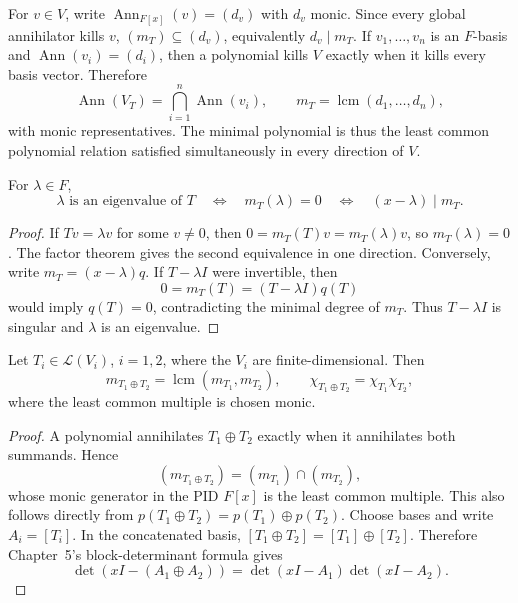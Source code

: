 For \(v\in V\), write \(\operatorname{Ann}_{F[x]}(v)=(d_v)\) with \(d_v\)
monic. Since every global annihilator kills \(v\),
\((m_T)\subseteq(d_v)\), equivalently \(d_v\mid m_T\). If
\(v_1,\ldots,v_n\) is an \(F\)-basis and
\(\operatorname{Ann}(v_i)=(d_i)\), then a polynomial kills \(V\) exactly
when it kills every basis vector. Therefore
\[
\operatorname{Ann}(V_T)=\bigcap_{i=1}^n\operatorname{Ann}(v_i),
\qquad
m_T=\operatorname{lcm}(d_1,\ldots,d_n),
\]
with monic representatives. The minimal polynomial is thus the least common
polynomial relation satisfied simultaneously in every direction of \(V\).

\begin{proposition}
\label{prop:eigenvalue-minimal-polynomial}
For \(\lambda\in F\),
\[
\lambda\text{ is an eigenvalue of }T
\quad\Longleftrightarrow\quad m_T(\lambda)=0
\quad\Longleftrightarrow\quad (x-\lambda)\mid m_T.
\]
\end{proposition}
\begin{proof}
If \(Tv=\lambda v\) for some \(v\ne0\), then
\(0=m_T(T)v=m_T(\lambda)v\), so \(m_T(\lambda)=0\). The factor theorem gives
the second equivalence in one direction. Conversely, write
\(m_T=(x-\lambda)q\). If \(T-\lambda I\) were invertible, then
\[
0=m_T(T)=(T-\lambda I)q(T)
\]
would imply \(q(T)=0\), contradicting the minimal degree of \(m_T\). Thus
\(T-\lambda I\) is singular and \(\lambda\) is an eigenvalue.
\end{proof}

\begin{proposition}
\label{prop:direct-sum-polynomials}
Let \(T_i\in\mathcal L(V_i)\), \(i=1,2\), where the \(V_i\) are
finite-dimensional. Then
\[
m_{T_1\oplus T_2}
=\operatorname{lcm}(m_{T_1},m_{T_2}),
\qquad
\chi_{T_1\oplus T_2}=\chi_{T_1}\chi_{T_2},
\]
where the least common multiple is chosen monic.
\end{proposition}
\begin{proof}
A polynomial annihilates \(T_1\oplus T_2\) exactly when it annihilates both
summands.  Hence
\[
(m_{T_1\oplus T_2})
=(m_{T_1})\cap(m_{T_2}),
\]
whose monic generator in the PID \(F[x]\) is the least common multiple.
This also follows directly from
\(p(T_1\oplus T_2)=p(T_1)\oplus p(T_2)\). Choose bases and write
\(A_i=[T_i]\). In the concatenated basis,
\([T_1\oplus T_2]=[T_1]\oplus[T_2]\). Therefore
Chapter~5's block-determinant formula gives
\[
\det(xI-(A_1\oplus A_2))
=\det(xI-A_1)\det(xI-A_2).
\]
\end{proof}

